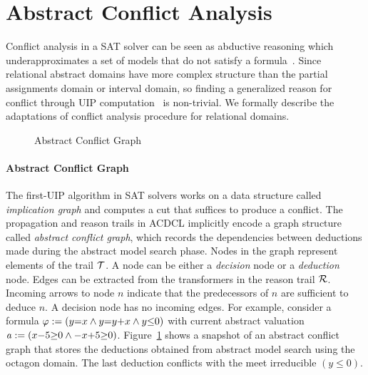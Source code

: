 \section{Abstract Conflict Analysis}\label{sec:conflict}
Conflict analysis in a SAT solver can be seen as abductive 
reasoning which underapproximates a set of models that do not satisfy a 
formula~\cite{sas12,dhk2013-popl}.  
Since relational abstract domains have more complex structure than the partial 
assignments domain or interval domain, so finding a generalized reason for 
conflict through UIP computation~\cite{uip} is non-trivial.  We formally 
describe the adaptations of conflict analysis procedure for relational domains. %
\begin{figure}[t]
\vspace*{-10ex} %
\caption{\label{conflict} Abstract Conflict Graph}
\end{figure}  

\paragraph {\textbf{Abstract Conflict Graph}}
The first-UIP algorithm in SAT solvers works on a data structure
called {\em implication graph} and computes a cut that suffices to
produce a conflict.  The propagation and reason trails in ACDCL
implicitly encode a graph structure called {\em abstract conflict
  graph}, which records the dependencies between deductions made
during the abstract model search phase.  Nodes in the graph represent
elements of the trail $\mathcal{T}$.  A node can be either a {\em decision}
node or a {\em deduction} node. Edges can be extracted from the
transformers in the reason trail $\mathcal{R}$.  Incoming arrows to node
$n$ indicate that the predecessors of $n$ are sufficient to deduce
$n$.  A decision node has no incoming edges.  For example, consider a
formula $\varphi:= (y{=}x \wedge y{=}y{+}x \wedge y {\leq} 0)$ with
current abstract valuation $\mathit{a}:= (x{-}5 {\geq} 0 \wedge {-}x{+}5 {\geq}
0)$.  Figure~\ref{conflict} shows a snapshot of an abstract conflict
graph that stores the deductions obtained from abstract model search
using the octagon domain.  The last deduction conflicts with the
meet irreducible $(y \leq 0)$.

